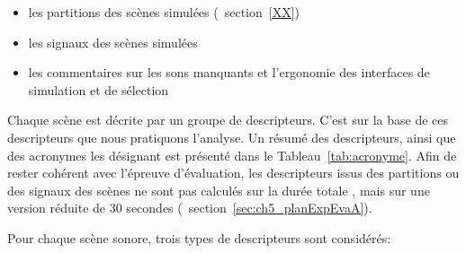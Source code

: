 
\begin{itemize}
\item les partitions des scènes simulées (\Cf~section~\ref{XX})
\item les signaux des scènes simulées
\item les commentaires sur les sons manquants et l'ergonomie des interfaces de simulation et de sélection
\end{itemize}

Chaque scène est décrite par un groupe de descripteurs. C'est sur la base de ces descripteurs que nous pratiquons l'analyse. Un résumé des descripteurs, ainsi que des acronymes les désignant est présenté dans le Tableau~\ref{tab:acronyme}. Afin de rester cohérent avec l'épreuve d'évaluation, les descripteurs issus des partitions ou des signaux des scènes ne sont pas calculés sur la durée totale  , mais sur une version réduite de 30 secondes (\Cf~section~\ref{sec:ch5_planExpEvaA}). 

Pour chaque scène sonore, trois types de descripteurs sont considérés:

